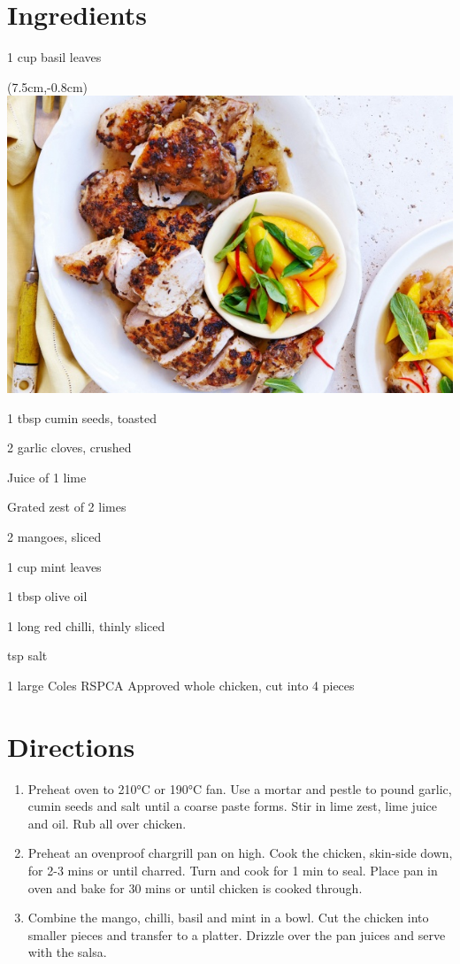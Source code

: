 \section*{Ingredients}
\bigskip
\begin{ingredients-list}
	\item 1 cup basil leaves
		\begin{textblock*}{8cm}(7.5cm,-0.8cm) %
			\includegraphics[scale=0.39]{./img/lime_cumin_chicken.jpg}
		\end{textblock*}
	\item 1 tbsp cumin seeds, toasted
	\item 2 garlic cloves, crushed
	\item Juice of 1 lime
	\item Grated zest of 2 limes
	\item 2 mangoes, sliced
	\item 1 cup mint leaves
	\item 1 tbsp olive oil
	\item 1 long red chilli, thinly sliced
	\item {} tsp salt
	\item 1 large Coles RSPCA Approved whole chicken, cut into 4 pieces
\end{ingredients-list}

\section*{Directions}
\begin{enumerate}
	\item Preheat oven to 210°C or 190°C fan. Use a mortar and pestle to pound garlic, cumin seeds and salt until a coarse paste forms.
		Stir in lime zest, lime juice and oil. Rub all over chicken.
	\item Preheat an ovenproof chargrill pan on high. Cook the chicken, skin-side down, for 2-3 mins or until charred. Turn and cook for 1 min to seal.
		Place pan in oven and bake for 30 mins or until chicken is cooked through.
	\item Combine the mango, chilli, basil and mint in a bowl. Cut the chicken into smaller pieces and transfer to a platter. Drizzle over the pan juices and serve with the salsa.
\end{enumerate}
 

